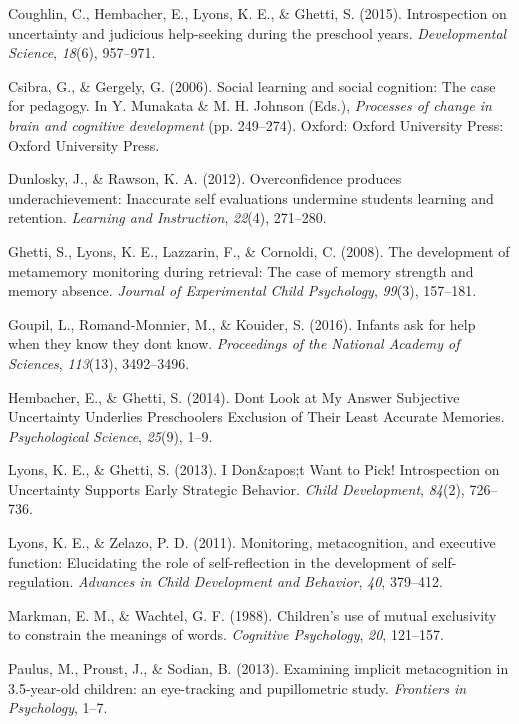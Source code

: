\documentclass[10pt, letterpaper]{article}
\begin{document}
\hypertarget{ref-Coughlin2015}{}
Coughlin, C., Hembacher, E., Lyons, K. E., \& Ghetti, S. (2015).
Introspection on uncertainty and judicious help-seeking during the
preschool years. \emph{Developmental Science}, \emph{18}(6), 957--971.

\hypertarget{ref-Csibra2006}{}
Csibra, G., \& Gergely, G. (2006). Social learning and social cognition:
The case for pedagogy. In Y. Munakata \& M. H. Johnson (Eds.),
\emph{Processes of change in brain and cognitive development} (pp.
249--274). Oxford: Oxford University Press: Oxford University Press.

\hypertarget{ref-Dunlosky2012}{}
Dunlosky, J., \& Rawson, K. A. (2012). Overconfidence produces
underachievement: Inaccurate self evaluations undermine students
learning and retention. \emph{Learning and Instruction}, \emph{22}(4),
271--280.

\hypertarget{ref-Ghetti2008}{}
Ghetti, S., Lyons, K. E., Lazzarin, F., \& Cornoldi, C. (2008). The
development of metamemory monitoring during retrieval: The case of
memory strength and memory absence. \emph{Journal of Experimental Child
Psychology}, \emph{99}(3), 157--181.

\hypertarget{ref-Goupil2016}{}
Goupil, L., Romand-Monnier, M., \& Kouider, S. (2016). Infants ask for
help when they know they dont know. \emph{Proceedings of the National
Academy of Sciences}, \emph{113}(13), 3492--3496.

\hypertarget{ref-Hembacher2014}{}
Hembacher, E., \& Ghetti, S. (2014). Dont Look at My Answer Subjective
Uncertainty Underlies Preschoolers Exclusion of Their Least Accurate
Memories. \emph{Psychological Science}, \emph{25}(9), 1--9.

\hypertarget{ref-Lyons2013}{}
Lyons, K. E., \& Ghetti, S. (2013). I Don\&apos;t Want to Pick!
Introspection on Uncertainty Supports Early Strategic Behavior.
\emph{Child Development}, \emph{84}(2), 726--736.

\hypertarget{ref-Lyons2011}{}
Lyons, K. E., \& Zelazo, P. D. (2011). Monitoring, metacognition, and
executive function: Elucidating the role of self-reflection in the
development of self-regulation. \emph{Advances in Child Development and
Behavior}, \emph{40}, 379--412.

\hypertarget{ref-Markman1988}{}
Markman, E. M., \& Wachtel, G. F. (1988). Children's use of mutual
exclusivity to constrain the meanings of words. \emph{Cognitive
Psychology}, \emph{20}, 121--157.

\hypertarget{ref-Paulus2013}{}
Paulus, M., Proust, J., \& Sodian, B. (2013). Examining implicit
metacognition in 3.5-year-old children: an eye-tracking and
pupillometric study. \emph{Frontiers in Psychology}, 1--7.
\end{document}

